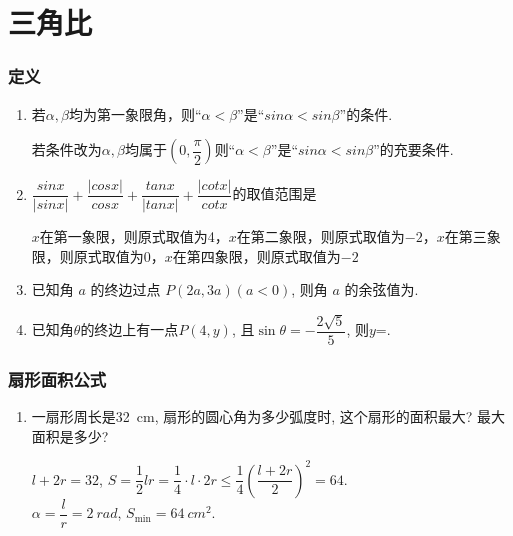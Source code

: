 \chapter*{三角比}
\subsection*{定义}
\begin{enumerate}
    \item 若$\alpha, \beta$均为第一象限角，则“$\alpha < \beta$”是“$sin\alpha < sin\beta$”的条件.
    \begin{jieda}
        若条件改为$\alpha, \beta$均属于$(0, \dfrac{\pi}{2})$则“$\alpha < \beta$”是“$sin\alpha < sin\beta$”的充要条件.
    \end{jieda}

    \item $\dfrac{sinx}{|sinx|} + \dfrac{|cosx|}{cosx} + \dfrac{tanx}{|tanx|} + \dfrac{|cotx|}{cotx}$的取值范围是
    \begin{jieda}
        $x$在第一象限，则原式取值为4，$x$在第二象限，则原式取值为$-2$，$x$在第三象限，则原式取值为0，$x$在第四象限，则原式取值为$-2$
    \end{jieda}
    \item 已知角 $a$ 的终边过点 $P\left(2 a, 3 a\right)\left(a<0\right)$, 则角 $a$ 的余弦值为.
    \item 已知角$\theta$的终边上有一点$P\left(4,y\right)$, 且$\sin\theta=-\dfrac{2\sqrt{5}}{5}$, 则$y$=. 
\end{enumerate}
\subsection*{扇形面积公式}
\begin{enumerate}
    \item 一扇形周长是\SI{32}{cm}, 扇形的圆心角为多少弧度时, 这个扇形的面积最大? 最大面积是多少? 
    \begin{jieda}
    $l+2r=32$, $S=\dfrac{1}{2}lr=\dfrac{1}{4}\cdot l\cdot2r\leq\dfrac{1}{4}\left(\dfrac{l+2r}{2}\right)^2=64$. \\
    $\alpha=\dfrac{l}{r}=\SI{2}{rad}$, $S_{\min}=\SI{64}{cm^2}$. 
    \end{jieda}
\end{enumerate}
